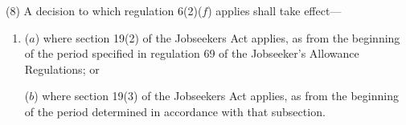 \documentclass[12pt,a4paper]{article}
\begin{document}
(8) A decision to which regulation 6(2)($f$)  applies shall take effect—
\begin{enumerate}\item[]
($a$) where section 19(2) of the Jobseekers Act applies, as from the beginning of the period specified in regulation 69 of the Jobseeker’s Allowance Regulations; or

($b$) where section 19(3) of the Jobseekers Act applies, as from the beginning of the period determined in accordance with that subsection.
\end{enumerate}

%
%
\end{document}

